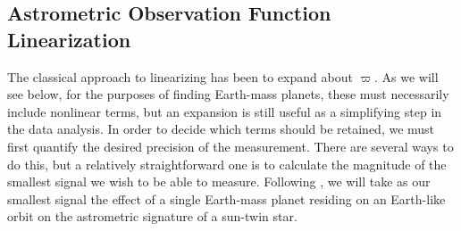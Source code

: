\subsection{Astrometric Observation Function Linearization}\label{sec:expansion}
The classical approach to linearizing  has been to expand about $\varpi$.  As we will see below, for the purposes of finding Earth-mass planets, these must necessarily include nonlinear terms, but an expansion is still useful as a simplifying step in the data analysis.  In order to decide which terms should be retained, we must first quantify the desired precision of the measurement.  There are several ways to do this, but a relatively straightforward one is to calculate the magnitude of the smallest signal we wish to be able to measure.  Following \citet{savransky2010simulation}, we will take as our smallest signal the effect of a single Earth-mass planet residing on an Earth-like orbit on the astrometric signature of a sun-twin star. 

